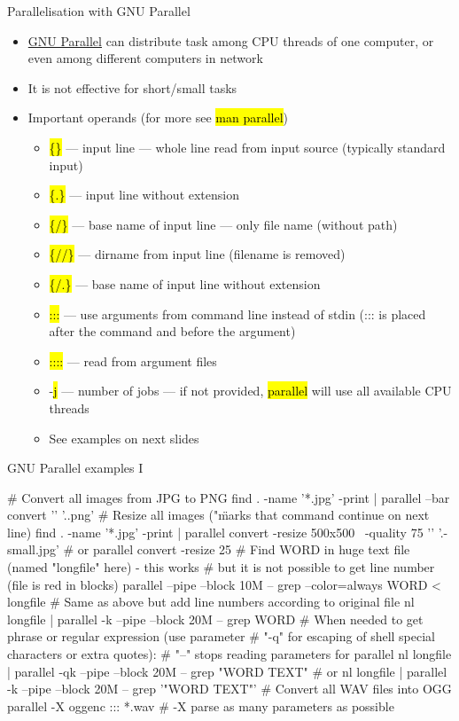 \documentclass[compress, ucs, xelatex, 11pt, xcolor=svgnames, aspectratio=169,
	hyperref={
		bookmarks=true,
		unicode=true,
		colorlinks=true,
		pdftitle={Linux, command line and MetaCentrum},
		plainpages=false,
		pdfauthor={Vojtech Zeisek},
		pdfsubject={Course about use of Linux command line, writing shell scripts and using MetaCentrum of CESNET},
		pdfcreator={XeLaTeX},
		pdfkeywords={Linux, GNU, BASH, shell, command line, MetaCentrum},
		linkcolor=DarkRed, %
		anchorcolor=DarkBlue, %
		citecolor=Indigo, %
		filecolor=NavyBlue, %
		menucolor=DarkMagenta, %
		urlcolor=DarkBlue, %
		pdftex},
	url={hyphens, lowtilde} %
	]{beamer}
\renewcommand{\texttt}[1]{\hl{\ttfamily #1}}
\begin{document}
\begin{frame}{Parallelisation with GNU Parallel}
	\begin{itemize}
		\item \href{https://www.gnu.org/software/parallel/}{GNU Parallel} can distribute task among CPU threads of one computer, or even among different computers in network
		\item It is not effective for short/small tasks
		\item Important operands (for more see \texttt{man parallel})
		\begin{itemize}
			\item \texttt{\{\}} --- input line --- whole line read from input source (typically standard input)
			\item \texttt{\{.\}} --- input line without extension
			\item \texttt{\{/\}} --- base name of input line --- only file name (without path)
			\item \texttt{\{//\}} --- dirname from input line (filename is removed)
			\item \texttt{\{/.\}} --- base name of input line without extension
			\item \texttt{:::} --- use arguments from command line instead of stdin (::: is placed after the command and before the argument)
			\item \texttt{::::} --- read from argument files
			\item -\texttt{j} --- number of jobs --- if not provided, \texttt{parallel} will use all available CPU threads
			\item See examples on next slides
		\end{itemize}
	\end{itemize}
\end{frame}

\begin{frame}[fragile]{GNU Parallel examples I}
	\begin{bashcode}
    # Convert all images from JPG to PNG
    find . -name '*.jpg' -print | parallel --bar convert '{}' '{.}.png'
    # Resize all images ("\" marks that command continue on next line)
    find . -name '*.jpg' -print | parallel convert -resize 500x500 \
      -quality 75 '{}' '{.}-small.jpg' # or
    parallel convert -resize 25%
    # Find WORD in huge text file (named "longfile" here) - this works
    # but it is not possible to get line number (file is red in blocks)
    parallel --pipe --block 10M -- grep --color=always WORD < longfile
    # Same as above but add line numbers according to original file
    nl longfile | parallel -k --pipe --block 20M -- grep WORD
    # When needed to get phrase or regular expression (use parameter
    # "-q" for escaping of shell special characters or extra quotes):
    # "--" stops reading parameters for parallel
    nl longfile | parallel -qk --pipe --block 20M -- grep "WORD TEXT" # or
    nl longfile | parallel -k --pipe --block 20M -- grep '"WORD TEXT"'
    # Convert all WAV files into OGG
    parallel -X oggenc ::: *.wav # -X parse as many parameters as possible
	\end{bashcode}
\end{frame}
\end{document}
